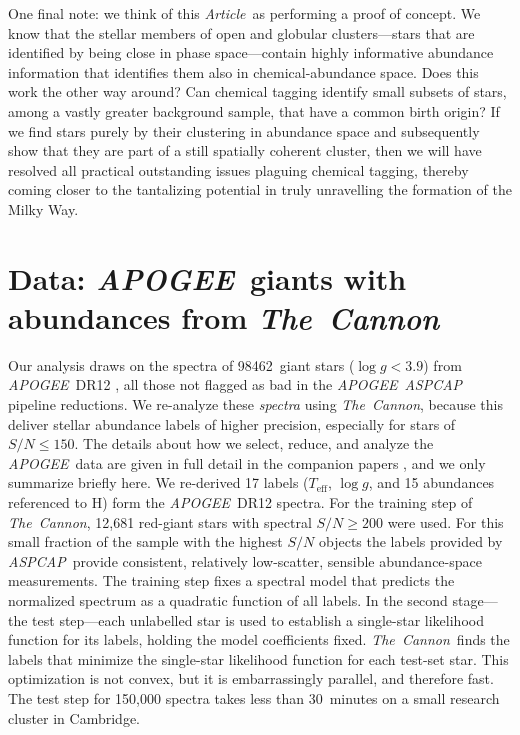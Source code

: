 \documentclass[12pt, letterpaper, preprint]{aastex}
\newcommand{\acronym}[1]{{\small{#1}}}
\newcommand{\project}[1]{\textsl{#1}}
\newcommand{\apogee}{\project{\acronym{APOGEE}}}
\newcommand{\aspcap}{\project{\acronym{ASPCAP}}}
\newcommand{\thecannon}{\project{The~Cannon}}
\newcommand{\documentname}{\textsl{Article}}
\newcommand{\teff}{T_{\mathrm{eff}}}
\newcommand{\logg}{\log g}
\newcommand{\totalnumber}{98462}
\begin{document}
One final note:
we think of this \documentname\ as performing a proof of concept.
We know that the stellar members of open and globular clusters---stars
that are identified by being close in phase space---contain highly
informative abundance information that identifies them also in
chemical-abundance space.  Does this work the other way around? 
Can chemical tagging identify small subsets of stars, among a vastly
greater background sample, that have a common birth origin? If we 
find stars purely by their clustering in abundance space and subsequently
show that they are part of a still spatially coherent cluster, then
we will have resolved all practical outstanding issues plaguing 
chemical tagging, thereby coming closer to the tantalizing potential 
in truly unravelling the formation of the Milky Way.

\section{Data: \apogee\ giants with abundances from \thecannon}\label{sec:data}


Our analysis draws on the spectra of \totalnumber\ giant stars ($\logg
< 3.9$) from \apogee\ \acronym{DR12} \citep{dr12}, all those not
flagged as bad in the \apogee\ \aspcap\ \citep{aspcap} pipeline
reductions.
We re-analyze these \emph{spectra} using \thecannon, because this
deliver stellar abundance labels of higher precision, especially for
stars of $S/N \le 150$.
The details about how we select, reduce, and analyze the \apogee\ data
are given in full detail in the companion papers \citep{casey16,
  ness16}, and we only summarize briefly here.
We re-derived 17 labels ($\teff$, $\logg$, and 15 abundances
referenced to H) form the \apogee\ \acronym{DR12} spectra. 
For the training step of \thecannon, 
12,681 red-giant stars with spectral $S/N \ge 200$ were used.
For this small fraction of the sample with the highest $S/N$ objects the
labels provided by \aspcap\ provide consistent, relatively low-scatter, sensible
abundance-space measurements.
The training step fixes a spectral model
that predicts the normalized spectrum as a quadratic function of all
labels. In the second stage---the test step---each unlabelled star is
used to establish a single-star likelihood function for its labels,
holding the model coefficients fixed.
\thecannon\ finds the labels that minimize the single-star likelihood
function for each test-set star.
This optimization is not convex, but it is embarrassingly parallel,
and therefore fast. The test
step for 150,000 spectra takes less than 30~minutes on a small 
research cluster in Cambridge.
\end{document}
